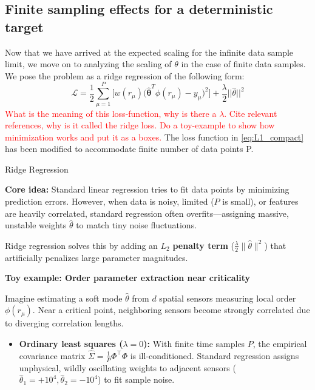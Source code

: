 \documentclass[11pt,a4paper]{article}
\theoremstyle{remark}
\def\sgp#1{{\sf\textcolor{red}{#1}}}
\begin{document}
\begin{onehalfspace}
\section{Finite sampling effects for a deterministic target}\label{sec:finiteSampleDeterministic}

Now that we have arrived at the expected scaling for the infinite data sample limit, we move on to analyzing the scaling of $\theta$ in the case of finite data samples. We pose the problem as a ridge regression of the following form:
\begin{equation}\label{eq:lossDeterminsitic}
\mathcal{L} = \frac{1}{2}\sum_{\mu=1}^P \big [w(r_\mu) \big ( \mathbf{\hat\theta}^T \phi(r_\mu) - y_\mu)^2\big ] + \frac{\lambda}{2}||\hat\theta||^2
\end{equation}
\sgp{What is the meaning of this loss-function, why is there a $\lambda$. Cite relevant references, why is it called the ridge loss. Do a toy-example to show how minimization works and put it as a boxes.} The loss function in \eqref{eq:L1_compact} has been modified to accommodate finite number of data points P. 
\vspace{1em}

\begin{entetebox}{\large{Ridge Regression}}

\textbf{Core idea:} Standard linear regression tries to fit data points by minimizing prediction errors. However, when data is noisy, limited ($P$ is small), or features are heavily correlated, standard regression often overfits—assigning massive, unstable weights $\hat{\theta}$ to match tiny noise fluctuations. 

Ridge regression solves this by adding an $L_2$ \textbf{penalty term} ($\frac{\lambda}{2} \|\hat{\theta}\|^2$) that artificially penalizes large parameter magnitudes.

\tcbline

\textbf{Toy example: Order parameter extraction near criticality}

Imagine estimating a soft mode $\hat{\theta}$ from $d$ spatial sensors measuring local order $\phi(r_\mu)$. Near a critical point, neighboring sensors become strongly correlated due to diverging correlation lengths.

\begin{itemize}
    \item \textbf{Ordinary least squares ($\lambda = 0$):} 
    With finite time samples $P$, the empirical covariance matrix $\widehat{\Sigma} = \frac{1}{P}\Phi^\top \Phi$ is ill-conditioned. Standard regression assigns unphysical, wildly oscillating weights to adjacent sensors ($\hat{\theta}_1 = +10^4, \hat{\theta}_2 = -10^4$) to fit sample noise.
    

\end{itemize}
\end{entetebox}
\end{onehalfspace}
\end{document}
